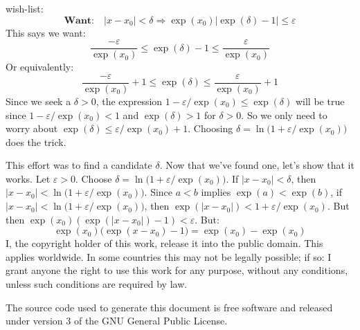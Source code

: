 \documentclass{article}
\theoremstyle{normal}
\theoremstyle{plain}
\begin{document}
    wish-list:
    \begin{equation}
        \textbf{Want:}\quad
        |x-x_{0}|<\delta
        \Rightarrow
        \exp(x_{0})\big|\exp(\delta)-1\big|\leq\varepsilon
    \end{equation}
    This says we want:
    \begin{equation}
        \frac{-\varepsilon}{\exp(x_{0})}\leq
        \exp(\delta)-1\leq\frac{\varepsilon}{\exp(x_{0})}
    \end{equation}
    Or equivalently:
    \begin{equation}
        \frac{-\varepsilon}{\exp(x_{0})}+1\leq
        \exp(\delta)\leq\frac{\varepsilon}{\exp(x_{0})}+1
    \end{equation}
    Since we seek a $\delta>0$, the expression
    $1-\varepsilon/\exp(x_{0})\leq\exp(\delta)$ will be true since
    $1-\varepsilon/\exp(x_{0})<1$ and $\exp(\delta)>1$ for $\delta>0$. So we
    only need to worry about $\exp(\delta)\leq\varepsilon/\exp(x_{0})+1$.
    Choosing $\delta=\ln\big(1+\varepsilon/\exp(x_{0})\big)$ does the trick.
    \par\hfill\par
    This effort was to find a candidate $\delta$. Now that we've
    found one, let's show that it works. Let $\varepsilon>0$. Choose
    $\delta=\ln\big(1+\varepsilon/\exp(x_{0})\big)$. If
    $|x-x_{0}|<\delta$, then
    $|x-x_{0}|<\ln\big(1+\varepsilon/\exp(x_{0})\big)$. Since $a<b$ implies
    $\exp(a)<\exp(b)$, if $|x-x_{0}|<\ln\big(1+\varepsilon/\exp(x_{0})\big)$,
    then $\exp(|x-x_{0}|)<1+\varepsilon/\exp(x_{0})$. But then
    $\exp(x_{0})(\exp(|x-x_{0}|)-1)<\varepsilon$. But:
    \begin{equation}
        \exp(x_{0})\big(\exp(x-x_{0})-1\big)
        =\exp(x_{0})-\exp(x_{0})
    \end{equation}
    \newpage
    I, the copyright holder of this work, release it into the public domain.
    This applies worldwide. In some countries this may not be legally possible;
    if so: I grant anyone the right to use this work for any purpose, without
    any conditions, unless such conditions are required by law.
    \par\hfill\par
    The source code used to generate this document is free software and released
    under version 3 of the GNU General Public License.
\end{document}
